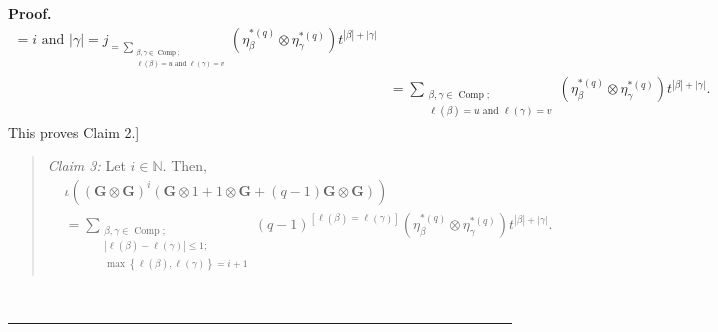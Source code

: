 \documentclass[numbers=enddot,12pt,final,onecolumn,notitlepage]{scrartcl}%
\theoremstyle{definition}
\newenvironment{statement}{\begin{quote}}{\end{quote}}
\newenvironment{proof}[1][Proof]{\noindent\textbf{#1.} }{\ \rule{0.5em}{0.5em}}
\let\sumnonlimits\sum
\renewcommand{\sum}{\sumnonlimits\limits}
\begin{document}
\begin{proof}
\begin{align*}
{{{=i\text{ and }\left\vert \gamma\right\vert =j}}}_{=\sum_{\substack{\beta
,\gamma\in\operatorname*{Comp};\\\ell\left(  \beta\right)  =u\text{ and }%
\ell\left(  \gamma\right)  =v}}}\left(  \eta_{\beta}^{\ast\left(  q\right)
}\otimes\eta_{\gamma}^{\ast\left(  q\right)  }\right)  t^{\left\vert
\beta\right\vert +\left\vert \gamma\right\vert }\\
&  =\sum_{\substack{\beta,\gamma\in\operatorname*{Comp};\\\ell\left(
\beta\right)  =u\text{ and }\ell\left(  \gamma\right)  =v}}\left(  \eta
_{\beta}^{\ast\left(  q\right)  }\otimes\eta_{\gamma}^{\ast\left(  q\right)
}\right)  t^{\left\vert \beta\right\vert +\left\vert \gamma\right\vert }.
\end{align*}
This proves Claim 2.]

\begin{statement}
\textit{Claim 3:} Let $i\in\mathbb{N}$. Then,%
\begin{align*}
&  \iota\left(  \left(  \mathbf{G}\otimes\mathbf{G}\right)  ^{i}\left(
\mathbf{G}\otimes1+1\otimes\mathbf{G}+\left(  q-1\right)  \mathbf{G}%
\otimes\mathbf{G}\right)  \right) \\
&  =\sum_{\substack{\beta,\gamma\in\operatorname*{Comp};\\\left\vert
\ell\left(  \beta\right)  -\ell\left(  \gamma\right)  \right\vert \leq
1;\\\max\left\{  \ell\left(  \beta\right)  ,\ell\left(  \gamma\right)
\right\}  =i+1}}\left(  q-1\right)  ^{\left[  \ell\left(  \beta\right)
=\ell\left(  \gamma\right)  \right]  }\left(  \eta_{\beta}^{\ast\left(
q\right)  }\otimes\eta_{\gamma}^{\ast\left(  q\right)  }\right)  t^{\left\vert
\beta\right\vert +\left\vert \gamma\right\vert }.
\end{align*}

\end{statement}


\end{proof}
\end{document}
